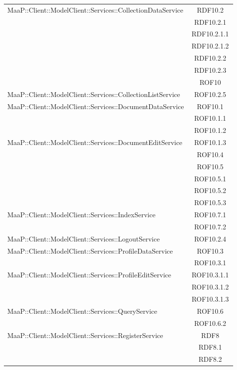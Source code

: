 \begin{center}
\begin{longtable}{|p{0.8\linewidth}|c|}
\midrule
MaaP::Client::ModelClient::Services::CollectionDataService
& RDF10.2\\
& RDF10.2.1\\
& RDF10.2.1.1\\
& RDF10.2.1.2\\
& RDF10.2.2\\
& RDF10.2.3\\
& ROF10\\

\midrule
MaaP::Client::ModelClient::Services::CollectionListService
& ROF10.2.5\\

\midrule
MaaP::Client::ModelClient::Services::DocumentDataService
& ROF10.1\\
& ROF10.1.1\\
& ROF10.1.2\\

\midrule
MaaP::Client::ModelClient::Services::DocumentEditService
& ROF10.1.3\\
& ROF10.4\\
& ROF10.5\\
& ROF10.5.1\\
& ROF10.5.2\\
& ROF10.5.3\\

\midrule
MaaP::Client::ModelClient::Services::IndexService
& ROF10.7.1\\
& ROF10.7.2\\

\midrule
MaaP::Client::ModelClient::Services::LogoutService
& ROF10.2.4\\

\midrule
MaaP::Client::ModelClient::Services::ProfileDataService
& ROF10.3\\
& ROF10.3.1\\

\midrule
MaaP::Client::ModelClient::Services::ProfileEditService
& ROF10.3.1.1\\
& ROF10.3.1.2\\
& ROF10.3.1.3\\

\midrule
MaaP::Client::ModelClient::Services::QueryService
& ROF10.6\\
& ROF10.6.2\\

\midrule
MaaP::Client::ModelClient::Services::RegisterService
& RDF8\\
& RDF8.1\\
& RDF8.2\\


\end{longtable}
\end{center}
